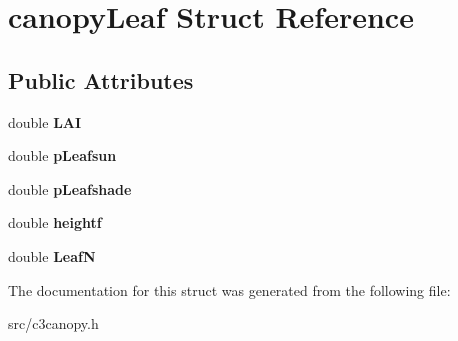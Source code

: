 \hypertarget{structcanopy_leaf}{\section{canopy\-Leaf Struct Reference}
\label{structcanopy_leaf}
}
\subsection*{Public Attributes}
\begin{DoxyCompactItemize}
\item 
\hypertarget{structcanopy_leaf_a653934aa71746ffdad5ecaa829a68000}{double {\bfseries L\-A\-I}}\label{structcanopy_leaf_a653934aa71746ffdad5ecaa829a68000}

\item 
\hypertarget{structcanopy_leaf_a2af760dd6d217831c95f68e54b270053}{double {\bfseries p\-Leafsun}}\label{structcanopy_leaf_a2af760dd6d217831c95f68e54b270053}

\item 
\hypertarget{structcanopy_leaf_adf1d503f16e2e543ce9e1491bd6fcaee}{double {\bfseries p\-Leafshade}}\label{structcanopy_leaf_adf1d503f16e2e543ce9e1491bd6fcaee}

\item 
\hypertarget{structcanopy_leaf_a4bf41634752a5e93d571079045efd96c}{double {\bfseries heightf}}\label{structcanopy_leaf_a4bf41634752a5e93d571079045efd96c}

\item 
\hypertarget{structcanopy_leaf_a969ebef6c11fa964811e868da86b6365}{double {\bfseries Leaf\-N}}\label{structcanopy_leaf_a969ebef6c11fa964811e868da86b6365}

\end{DoxyCompactItemize}


The documentation for this struct was generated from the following file\-:\begin{DoxyCompactItemize}
\item 
src/c3canopy.\-h\end{DoxyCompactItemize}
